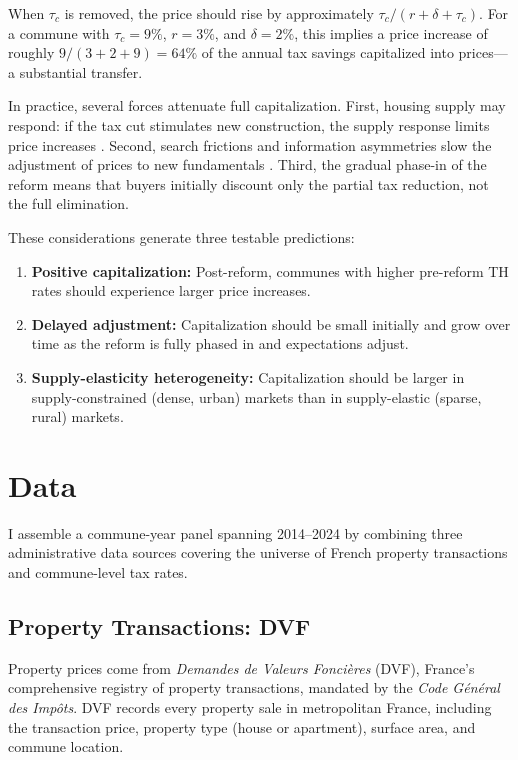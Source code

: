 \documentclass[12pt]{article}
\begin{document}
\noindent When $\tau_c$ is removed, the price should rise by approximately $\tau_c / (r + \delta + \tau_c)$. For a commune with $\tau_c = 9\%$, $r = 3\%$, and $\delta = 2\%$, this implies a price increase of roughly $9 / (3 + 2 + 9) = 64\%$ of the annual tax savings capitalized into prices---a substantial transfer.

In practice, several forces attenuate full capitalization. First, housing supply may respond: if the tax cut stimulates new construction, the supply response limits price increases \citep{lutz2015fiscal}. Second, search frictions and information asymmetries slow the adjustment of prices to new fundamentals \citep{glaeser2014housing}. Third, the gradual phase-in of the reform means that buyers initially discount only the partial tax reduction, not the full elimination.

These considerations generate three testable predictions:

\begin{enumerate}
    \item \textbf{Positive capitalization:} Post-reform, communes with higher pre-reform TH rates should experience larger price increases.
    \item \textbf{Delayed adjustment:} Capitalization should be small initially and grow over time as the reform is fully phased in and expectations adjust.
    \item \textbf{Supply-elasticity heterogeneity:} Capitalization should be larger in supply-constrained (dense, urban) markets than in supply-elastic (sparse, rural) markets.
\end{enumerate}


\section{Data}

I assemble a commune-year panel spanning 2014--2024 by combining three administrative data sources covering the universe of French property transactions and commune-level tax rates.

\subsection{Property Transactions: DVF}

Property prices come from \emph{Demandes de Valeurs Fonci\`{e}res} (DVF), France's comprehensive registry of property transactions, mandated by the \emph{Code G\'{e}n\'{e}ral des Imp\^{o}ts}. DVF records every property sale in metropolitan France, including the transaction price, property type (house or apartment), surface area, and commune location.
\end{document}
